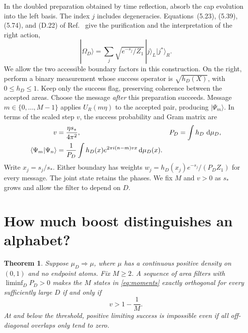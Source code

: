 \documentclass[11pt,letterpaper]{article}
\newtheorem{theorem}{Theorem}
\newcommand{\dd}{\mathop{}\!{\rm d}}
\newcommand{\sg}{s_*}
\begin{document}
In the doubled preparation obtained by time reflection, absorb the cap evolution into the left basis. The index $j$ includes degeneracies. Equations~(5.23), (5.39), (5.74), and (D.22) of Ref.~\cite{chandra} give the purification and the interpretation of the right action,
\begin{equation}\label{eq:state}
 |\Omega_D\rangle=\sum_j\sqrt{e^{-s_j}/Z_1}\,|j\rangle_L|j^*\rangle_R .
\end{equation}
We allow the two accessible boundary factors in this construction. On the right, perform a binary measurement whose success operator is $\sqrt{h_D(X)}$, with $0\leq h_D\leq1$. Keep only the success flag, preserving coherence between the accepted areas. Choose the message \emph{after} this preparation succeeds. Message $m\in\{0,\ldots,M-1\}$ applies $U_R(m\eta)$ to the accepted pair, producing $|\Psi_m\rangle$. In terms of the scaled step $v$, the success probability and Gram matrix are
\begin{align}
 v&=\frac{\eta\sg}{4\pi^2}, &P_D&=\int h_D\,\dd\mu_D, \nonumber\\
 \langle\Psi_m|\Psi_n\rangle
 &=\frac{1}{P_D}\int h_D(x)e^{2\pi i(n-m)vx}\dd\mu_D(x). \label{eq:moments}
\end{align}
Write $x_j=s_j/\sg$. Either boundary has weights $w_j=h_D(x_j)e^{-s_j}/(P_D Z_1)$ for every message. The joint state retains the phases. We fix $M$ and $v>0$ as $\sg$ grows and allow the filter to depend on $D$.

\section{How much boost distinguishes an alphabet?}
\begin{theorem}\label{th:threshold}
Suppose $\mu_D\Rightarrow\mu$, where $\mu$ has a continuous positive density on $(0,1)$ and no endpoint atoms. Fix $M\geq2$. A sequence of area filters with $\liminf_D P_D>0$ makes the $M$ states in \eqref{eq:moments} exactly orthogonal for every sufficiently large $D$ if and only if
\begin{equation}\label{eq:threshold}
 v>1-\frac1M .
\end{equation}
At and below the threshold, positive limiting success is impossible even if all off-diagonal overlaps only tend to zero.
\end{theorem}
\end{document}
